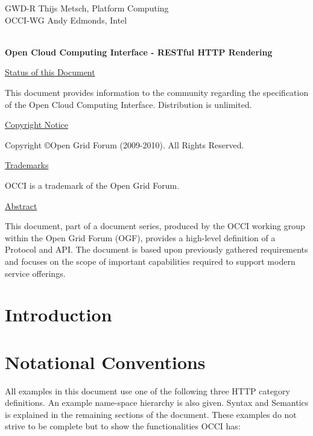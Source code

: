 \documentclass[10pt,a4paper]{article}
\begin{document}
\thispagestyle{empty}

GWD-R \hfill Thijs Metsch, Platform Computing\\
OCCI-WG \hfill Andy Edmonds, Intel\\
\\

\vspace*{0.5in}

\begin{Large}
\textbf{Open Cloud Computing Interface - RESTful HTTP Rendering}
\end{Large}

\vspace*{0.5in}

\underline{Status of this Document}

This document provides information to the community regarding the
specification of the Open Cloud Computing Interface. Distribution is
unlimited.

\underline{Copyright Notice}

Copyright \copyright Open Grid Forum (2009-2010). All Rights Reserved.

\underline{Trademarks}

OCCI is a trademark of the Open Grid Forum.

\underline{Abstract}

This document, part of a document series, produced by the OCCI working
group within the Open Grid Forum (OGF), provides a high-level
definition of a Protocol and API. The document is based upon
previously gathered requirements and focuses on the scope of important
capabilities required to support modern service offerings.

\newpage
\tableofcontents
\newpage

\section{Introduction}


\section{Notational Conventions}


All examples in this document use one of the following three HTTP
category definitions. An example name-space hierarchy is also
given. Syntax and Semantics is explained in the remaining sections of
the document. These examples do not strive to be complete but to show
the functionalities OCCI has:
\end{document}
